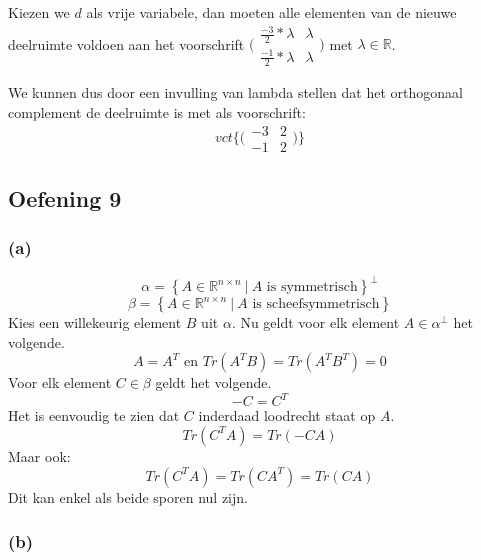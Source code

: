 \documentclass[lineaire_algebra_oplossingen.tex]{subfiles}
\begin{document}
Kiezen we $d$ als vrije variabele, dan moeten alle elementen van de nieuwe deelruimte voldoen aan het voorschrift $\bigl(\begin{smallmatrix}
\frac{-3}{2}*\lambda & \lambda \\
\frac{-1}{2}*\lambda & \lambda
\end{smallmatrix}\bigr)$ met $\lambda \in \mathbb{R}$.

We kunnen dus door een invulling van lambda stellen dat het orthogonaal complement de deelruimte is met als voorschrift:
\[
vct\{\bigl(\begin{smallmatrix}
-3 & 2 \\
-1 & 2
\end{smallmatrix}\bigr)\}
\]

\subsection{Oefening 9}
\subsubsection*{(a)}
\[
\alpha=
\left\{
A \in \mathbb{R}^{n\times n}\ |\ A \text{ is symmetrisch}
\right\}^\bot
\]
\[
\beta=
\left\{
A \in \mathbb{R}^{n\times n}\ |\ A \text{ is scheefsymmetrisch}
\right\}
\]
Kies een willekeurig element $B$ uit $\alpha$. Nu geldt voor elk element $A\in\alpha^\bot$ het volgende.
\[
A=A^T\text{ en } Tr(A^TB) = Tr(A^TB^T)= 0
\]
Voor elk element $C \in \beta$ geldt het volgende.
\[
-C = C^T
\]
Het is eenvoudig te zien dat $C$ inderdaad loodrecht staat op $A$.
\[
Tr(C^TA) = Tr(-CA)
\]
Maar ook:
\[
Tr(C^TA) = Tr(CA^T) = Tr(CA)
\]
Dit kan enkel als beide sporen nul zijn.


\subsubsection*{(b)}
\end{document}
